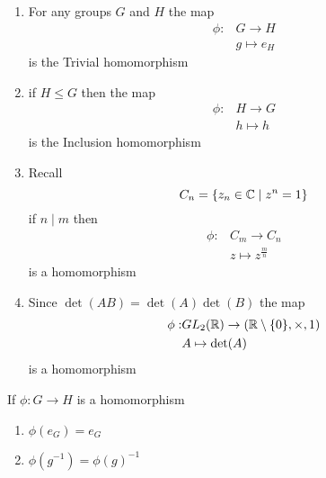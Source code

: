 \documentclass{article}
\begin{document}
\begin{eg}\leavevmode
    \begin{enumerate}
        \item For any groups $G$ and $H$ the map 
        \begin{align*}
            \phi: &G \rightarrow H \\
            &g \mapsto e_H
        \end{align*}
        is the Trivial homomorphism

        \item if $H \leq G$ then the map
        \begin{align*}
            \phi: &H \rightarrow G \\
            &h \mapsto h
        \end{align*}
        is the Inclusion homomorphism

        \item Recall
        \[
            C_n = \{z_n \in \mathbb{C} \mid z^n = 1\}  
        \]
        if $n \mid m$ then
        \begin{align*}
            \phi: &C_m \rightarrow C_n \\
            &z \mapsto z^\frac{m}{n}
        \end{align*}
        is a homomorphism

        \item Since $\det(AB) = \det(A)\det(B)$ the map
        \begin{align*}
            \phi: &GL_2(\mathbb{R}) \rightarrow (\mathbb{R} \setminus \{0\}, \times, 1) \\
            &A \mapsto \det(A)
        \end{align*}
        is a homomorphism
    \end{enumerate}
\end{eg}

\begin{lemma}
    If $\phi: G \rightarrow H$ is a homomorphism
    \begin{enumerate}
        \item $\phi(e_G) = e_G$
        \item $\phi(g^{-1}) = \phi(g)^{-1}$ 
    \end{enumerate}
\end{lemma}
\end{document}
